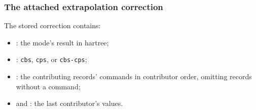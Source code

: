 \subsubsection*{The attached extrapolation correction}

The stored correction contains:

\begin{itemize}
  \item {}: the mode's result in hartree;
  \item {}: \texttt{cbs}, \texttt{cps}, or \texttt{cbs-cps};
  \item {}: the contributing records' commands in contributor
        order, omitting records without a command;
  \item {} and : the last contributor's
        values.
\end{itemize}

